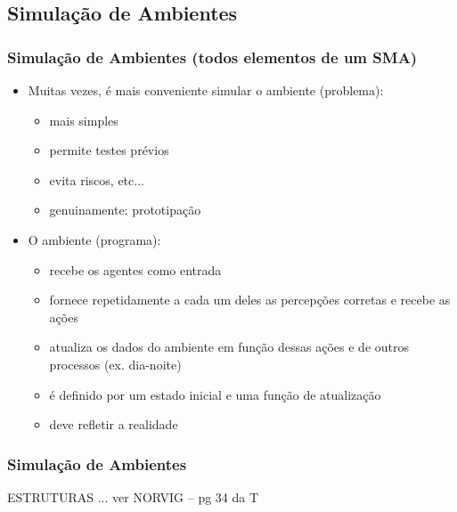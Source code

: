 \subsection{Simulação de Ambientes}
\begin{frame}

    \frametitle{Simulação de Ambientes (todos elementos de um SMA)}
    \begin{itemize}
    \pause
      \item Muitas vezes, é mais conveniente simular o ambiente (problema): \\
     \begin{itemize}
        \item  mais simples
        \item  permite testes prévios
        \item  evita riscos, etc...
                
        \item  genuinamente: prototipação
      \end{itemize}
\pause
      \item O ambiente (programa):
      \begin{itemize}
        \item recebe os agentes como entrada
        \item fornece repetidamente a cada um deles as percepções corretas e recebe as ações
        \item atualiza os dados do ambiente em função dessas ações e de outros processos (ex. dia-noite)
        \item é definido por um estado inicial e uma função de atualização
        \item deve refletir a realidade
    
      \end{itemize}
      
      
    \end{itemize}
\end{frame}





\begin{frame}

    \frametitle{Simulação de Ambientes}

     ESTRUTURAS ... ver NORVIG -- pg 34 da T

\end{frame}








\begin{comment}
\sectio{Aprendizagem}
\begin{frame}

    \frametitle{Aprendizagem}
    \begin{itemize}
    \pause
      \item 
\pause
      \item cap 7
    
    \end{itemize}
\end{frame}
\end{comment}
